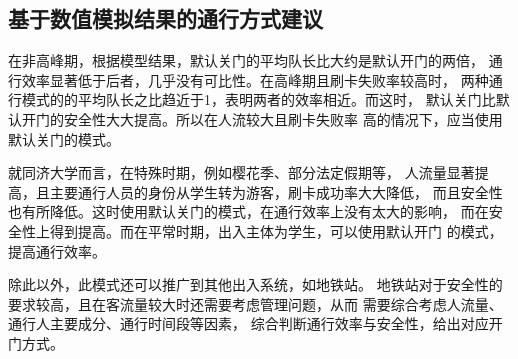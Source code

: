 \subsection{基于数值模拟结果的通行方式建议}
\par 在非高峰期，根据模型结果，默认关门的平均队长比大约是默认开门的两倍，
通行效率显著低于后者，几乎没有可比性。在高峰期且刷卡失败率较高时，
两种通行模式的的平均队长之比趋近于1，表明两者的效率相近。而这时，
默认关门比默认开门的安全性大大提高。所以在人流较大且刷卡失败率
高的情况下，应当使用默认关门的模式。
\par 就同济大学而言，在特殊时期，例如樱花季、部分法定假期等，
人流量显著提高，且主要通行人员的身份从学生转为游客，刷卡成功率大大降低，
而且安全性也有所降低。这时使用默认关门的模式，在通行效率上没有太大的影响，
而在安全性上得到提高。而在平常时期，出入主体为学生，可以使用默认开门
的模式，提高通行效率。
\par 除此以外，此模式还可以推广到其他出入系统，如地铁站。
地铁站对于安全性的要求较高，且在客流量较大时还需要考虑管理问题，从而
需要综合考虑人流量、通行人主要成分、通行时间段等因素，
综合判断通行效率与安全性，给出对应开门方式。